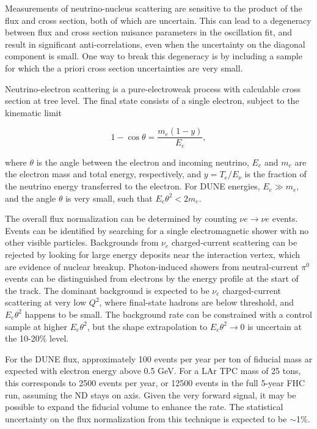 Measurements of neutrino-nucleus scattering are sensitive to the product of the flux and cross section, both of which are uncertain. This can lead to a degeneracy between flux and cross section nuisance parameters in the oscillation fit, and result in significant anti-correlations, even when the uncertainty on the diagonal component is small. One way to break this degeneracy is by including a sample for which the a priori cross section uncertainties are very small. 

Neutrino-electron scattering is a pure-electroweak process with calculable cross section at tree level. The final state consists of a single electron, subject to the kinematic limit 

\begin{equation}
1 - \cos \theta = \frac{m_{e}(1-y)}{E_{e}},
\end{equation}

where $\theta$ is the angle between the electron and incoming neutrino, $E_{e}$ and $m_{e}$ are the electron mass and total energy, respectively, and $y = T_{e}/E_{\nu}$ is the fraction of the neutrino energy transferred to the electron. For DUNE energies, $E_{e} \gg m_{e}$, and the angle $\theta$ is very small, such that $E_{e}\theta^{2} < 2m_{e}$.

The overall flux normalization can be determined by counting $\nu e \rightarrow \nu e$ events. Events can be identified by searching for a single electromagnetic shower with no other visible particles. Backgrounds from $\nu_{e}$ charged-current scattering can be rejected by looking for large energy deposits near the interaction vertex, which are evidence of nuclear breakup. Photon-induced showers from neutral-current $\pi^{0}$ events can be distinguished from electrons by the energy profile at the start of the track. The dominant background is expected to be $\nu_{e}$ charged-current scattering at very low $Q^{2}$, where final-state hadrons are below threshold, and $E_{e}\theta^{2}$ happens to be small. The background rate can be constrained with a control sample at higher $E_{e}\theta^{2}$, but the shape extrapolation to $E_{e}\theta^{2} \rightarrow 0$ is uncertain at the 10-20\% level.

For the DUNE flux, approximately 100 events per year per ton of fiducial mass ar expected with electron energy above 0.5 GeV. For a LAr TPC mass of 25 tons, this corresponds to 2500 events per year, or 12500 events in the full 5-year FHC run, assuming the ND stays on axis. Given the very forward signal, it may be possible to expand the fiducial volume to enhance the rate. The statistical uncertainty on the flux normalization from this technique is expected to be $\sim$1\%.



